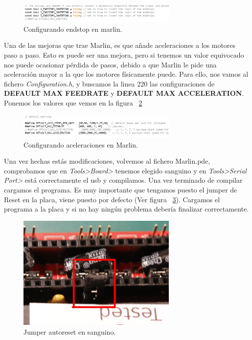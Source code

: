 		\begin{figure}[H]
			\centering
			\includegraphics[width=0.7\textwidth]{../../Fotos/27.png}
			\caption{Configurando endstop en marlin.}
			\label{fig:endstop.marlin}
		\end {figure}
		Una de las mejoras que trae Marlin, es que añade aceleraciones a los motores paso a paso. Esto es puede ser una mejora, pero si tenemos un valor equivocado nos puede ocasionar pérdida de pasos, debido a que Marlin le pide una aceleración mayor a la que los motores físicamente puede. Para ello, nos vamos al fichero \emph{Configuration.h}, y buscamos la linea 220 las configuraciones de \textbf{DEFAULT MAX FEEDRATE} y \textbf{DEFAULT MAX ACCELERATION}. Ponemos los valores que vemos en la figura ~\ref{fig:aceleracions.marlin}\\
		\begin{figure}[H]
			\centering
			\includegraphics[width=0.7\textwidth]{../../Fotos/45.png}
			\caption{Configurando aceleraciones en Marlin.}
			\label{fig:aceleracions.marlin}
		\end {figure}
		Una vez hechas estás modificaciones, volvemos al fichero Marlin.pde, comprobamos que en \emph{Tools>Board>} tenemos elegido sanguino y en \emph{Tools>Serial Port>} está correctamente el usb y compilamos. Una vez terminado de compilar cargamos el programa. Es muy importante que tengamos puesto el jumper de Reset en la placa, viene puesto por defecto (Ver figura ~\ref{fig:jumper.sanguino}). Cargamos el programa a la placa y si no hay ningún problema debería finalizar correctamente.
		
		\begin{figure}[H]
			\centering
			\includegraphics[width=0.7\textwidth]{../../Fotos/7.jpg}
			\caption{Jumper autoreset en sanguino.}
			\label{fig:jumper.sanguino}
		\end {figure}
		\newpage{}	
